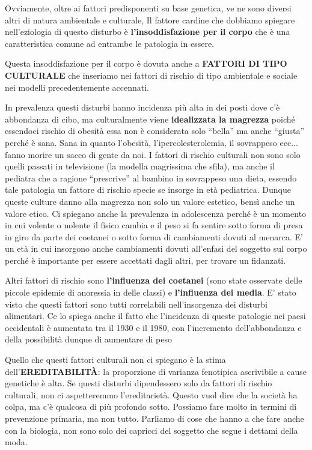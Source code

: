 \documentclass[]{article}
\begin{document}
Ovviamente, oltre ai fattori predisponenti su base genetica, ve ne sono
diversi altri di natura ambientale e culturale, Il fattore cardine che
dobbiamo spiegare nell'eziologia di questo disturbo è
\textbf{l'insoddisfazione per il corpo} che è una caratteristica comune
ad entrambe le patologia in essere.

Questa insoddisfazione per il corpo è dovuta anche a \textbf{FATTORI DI
TIPO CULTURALE} che inseriamo nei fattori di rischio di tipo ambientale
e sociale nei modelli precedentemente accennati.

In prevalenza questi disturbi hanno incidenza più alta in dei posti dove
c'è abbondanza di cibo, ma culturalmente viene \textbf{idealizzata la
magrezza} poiché essendoci rischio di obesità essa non è considerata
solo ``bella'' ma anche ``giusta'' perché è sana. Sana in quanto
l'obesità, l'ipercolesterolemia, il sovrappeso ecc... fanno morire un
sacco di gente da noi. I fattori di rischio culturali non sono solo
quelli passati in televisione (la modella magrissima che sfila), ma
anche il pediatra che a ragione ``prescrive'' al bambino in sovrappeso
una dieta, essendo tale patologia un fattore di rischio specie se
insorge in età pediatrica. Dunque queste culture danno alla magrezza non
solo un valore estetico, bensì anche un valore etico. Ci spiegano anche
la prevalenza in adolescenza perché è un momento in cui volente o
nolente il fisico cambia e il peso si fa sentire sotto forma di presa in
giro da parte dei coetanei o sotto forma di cambiamenti dovuti al
menarca. E' un età in cui insorgono anche cambiamenti dovuti all'enfasi
del soggetto sul corpo perché è importante per essere accettati dagli
altri, per trovare un fidanzati.

Altri fattori di rischio sono \textbf{l'influenza dei coetanei} (sono
state osservate delle piccole epidemie di anoressia in delle classi) e
\textbf{l'influenza dei media}. E' stato visto che questi fattori sono
tutti correlabili nell'insorgenza dei disturbi alimentari. Ce lo spiega
anche il fatto che l'incidenza di queste patologie nei paesi occidentali
è aumentata tra il 1930 e il 1980, con l'incremento dell'abbondanza e
della possibilità dunque di aumentare di peso

Quello che questi fattori culturali non ci spiegano è la stima
dell'\textbf{EREDITABILITÀ}: la proporzione di varianza fenotipica
ascrivibile a cause genetiche è alta. Se questi disturbi dipendessero
solo da fattori di rischio culturali, non ci aspetteremmo
l'ereditarietà. Questo vuol dire che la società ha colpa, ma c'è
qualcosa di più profondo sotto. Possiamo fare molto in termini di
prevenzione primaria, ma non tutto. Parliamo di cose che hanno a che
fare anche con la biologia, non sono solo dei capricci del soggetto che
segue i dettami della moda.
\end{document}
